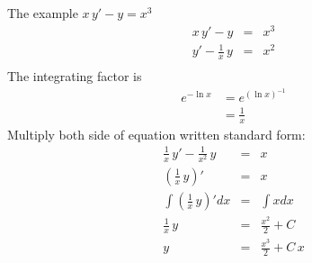 The example $x\, y' - y = x^3$
\begin{eqnarray*}
  x\, y' - y &=& x^3 \\
  y' - \frac{1}{x}\, y &=& x^2 \\
\end{eqnarray*}
The integrating factor is
\begin{align*}
  e^{- \ln x} &= e^{(\ln x)^{-1}} \\
  &= \frac{1}{x}
\end{align*}
Multiply both side of equation written standard form:
\begin{eqnarray*}
  \frac{1}{x}\,y' - \frac{1}{x^2}\, y &=& x \\
  (\frac{1}{x}\, y)' &=& x \\
  \int (\frac{1}{x}\, y)' dx &=& \int x dx \\
  \frac{1}{x}\, y &=& \frac{x^2}{2} + C\\
  y &=& \frac{x^3}{2} + C\,x
\end{eqnarray*}

